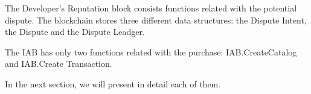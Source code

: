 The Developer's Reputation block consists functions related with the potential dispute. The blockchain stores three different data structures: the Dispute Intent, the Dispute and the Dispute Leadger.

The IAB has only two functions related with the purchase: IAB.CreateCatalog and IAB.Create Transaction.

In the next section, we will present in detail each of them.






%


